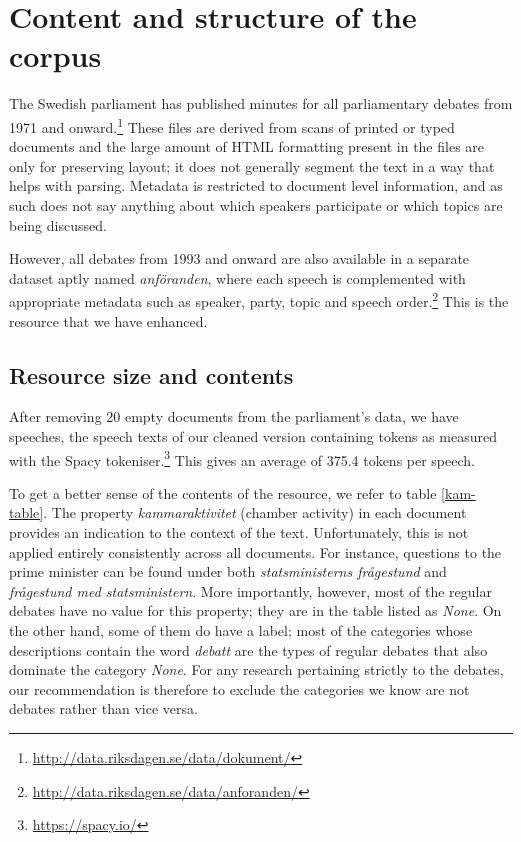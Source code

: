 \section{\label{contents-structure}Content and structure of the corpus}

The Swedish parliament has published minutes for all parliamentary debates from 1971 and onward.\footnote{\url{http://data.riksdagen.se/data/dokument/}} These files are derived from scans of printed or typed documents and the large amount of HTML formatting present in the files are only for preserving layout; it does not generally segment the text in a way that helps with parsing. Metadata is restricted to document level information, and as such does not say anything about which speakers participate or which topics are being discussed.

However, all debates from 1993 and onward are also available in a separate dataset aptly named \emph{anföranden}, where each speech is complemented with appropriate metadata such as speaker, party, topic and speech order.\footnote{\url{http://data.riksdagen.se/data/anforanden/}} This is the resource that we have enhanced.

\subsection{\label{resource-contents}Resource size and contents}

After removing 20 empty documents from the parliament's data, we have  speeches, the speech texts of our cleaned version containing  tokens as measured with the Spacy tokeniser.\footnote{\url{https://spacy.io/}} This gives an average of 375.4 tokens per speech.

To get a better sense of the contents of the resource, we refer to table \ref{kam-table}. The property \emph{kammaraktivitet} (chamber activity) in each document provides an indication to the context of the text. Unfortunately, this is not applied entirely consistently across all documents. For instance, questions to the prime minister can be found under both \emph{statsministerns frågestund} and \emph{frågestund med statsministern}. More importantly, however, most of the regular debates have no value for this property; they are in the table listed as \emph{None}. On the other hand, some of them do have a label; most of the categories whose descriptions contain the word \emph{debatt} are the types of regular debates that also dominate the category \emph{None}. For any research pertaining strictly to the debates, our recommendation is therefore to exclude the categories we know are not debates rather than vice versa. %



